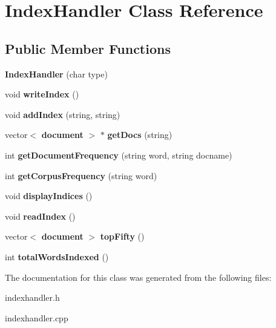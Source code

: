 \section{Index\+Handler Class Reference}
\label{class_index_handler}
\subsection*{Public Member Functions}
\begin{DoxyCompactItemize}
\item 
{\bfseries Index\+Handler} (char type)\label{class_index_handler_a222c2e9f12fef0e242c7870836df88e8}

\item 
void {\bfseries write\+Index} ()\label{class_index_handler_af4e152fb943fc9fd3962e008bd9e6ea5}

\item 
void {\bfseries add\+Index} (string, string)\label{class_index_handler_ad4bfa5c8de41b1b32a46db8094510d46}

\item 
vector$<$ {\bf document} $>$ $\ast$ {\bfseries get\+Docs} (string)\label{class_index_handler_a8d4cdec1dd190ba28dc8e743333ca597}

\item 
int {\bfseries get\+Document\+Frequency} (string word, string docname)\label{class_index_handler_adba159334381d1fa51741defbeaa7a34}

\item 
int {\bfseries get\+Corpus\+Frequency} (string word)\label{class_index_handler_a64ed60231ddbd004bef0a8b36a941947}

\item 
void {\bfseries display\+Indices} ()\label{class_index_handler_a62629856602056eea2172d8c207fb4de}

\item 
void {\bfseries read\+Index} ()\label{class_index_handler_a8a0cd8e4f2fe194a5ab11ab2922c39a4}

\item 
vector$<$ {\bf document} $>$ {\bfseries top\+Fifty} ()\label{class_index_handler_acbcc15002e12ab79d6fe05d7e8dc8833}

\item 
int {\bfseries total\+Words\+Indexed} ()\label{class_index_handler_ab23ff6f1883b84bb7fa8732e598ac403}

\end{DoxyCompactItemize}


The documentation for this class was generated from the following files\+:\begin{DoxyCompactItemize}
\item 
indexhandler.\+h\item 
indexhandler.\+cpp\end{DoxyCompactItemize}
